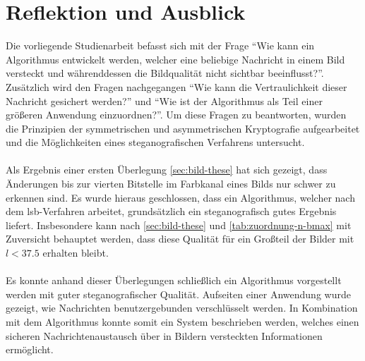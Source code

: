 \chapter{Reflektion und Ausblick}
Die vorliegende Studienarbeit befasst sich mit der Frage \enquote{Wie kann
  ein Algorithmus entwickelt werden, welcher eine beliebige Nachricht
  in einem Bild versteckt und während\-dessen die Bildqualität nicht sichtbar beeinflusst?}.
Zusätzlich wird den Fragen nachgegangen \enquote{Wie kann die Vertraulichkeit dieser Nachricht
  gesichert werden?} und \enquote{Wie ist der Algorithmus als Teil einer
  größeren Anwendung einzuordnen?}. Um diese Fragen zu beantworten, wurden die
Prinzipien der symmetrischen und asymmetrischen Kryptografie aufgearbeitet
und die Möglichkeiten eines steganografischen Verfahrens untersucht.\\\\
Als Ergebnis einer ersten Überlegung \eqref{sec:bild-these} hat sich gezeigt,
dass Änderungen bis zur vierten Bitstelle im Farbkanal eines Bilds nur
schwer zu erkennen sind. Es wurde hieraus geschlossen, dass ein
Algorithmus, welcher nach dem \acs{lsb}-Verfahren arbeitet,
grundsätzlich ein steganografisch gutes Ergebnis liefert.
Insbesondere kann nach \eqref{sec:bild-these} und \autoref{tab:zuordnung-n-bmax}
mit Zuversicht behauptet werden, dass diese Qualität für
ein Großteil der Bilder mit $l < \num{37.5}$ erhalten bleibt.\\\\
Es konnte anhand dieser Überlegungen schließlich ein Algorithmus vorgestellt werden
mit guter steganografischer Qualität.
Aufseiten einer Anwendung wurde gezeigt,
wie Nachrichten benutzergebunden verschlüsselt werden. In Kombination
mit dem Algorithmus konnte somit ein System beschrieben werden, welches einen
sicheren Nachrichtenaustausch über in Bildern versteckten Informationen ermöglicht.

